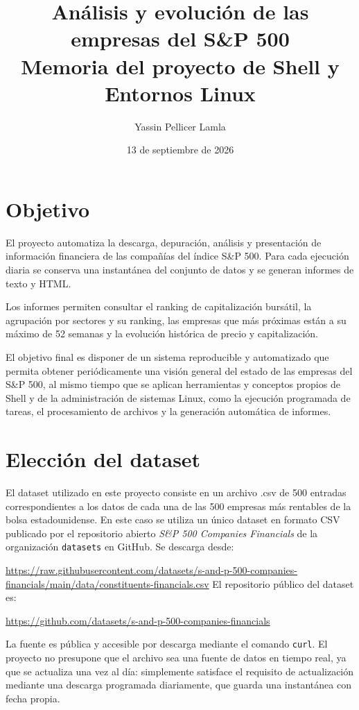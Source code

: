 \documentclass[11pt,a4paper]{article}
\title{\Huge Análisis y evolución de las empresas del S\&P 500\\[0.5\baselineskip] \large Memoria del proyecto de Shell y Entornos Linux}
\author{Yassin Pellicer Lamla}
\date{13 de septiembre de 2026}
\begin{document}
\maketitle
\tableofcontents
\newpage

\section{Objetivo}
El proyecto automatiza la descarga, depuración, análisis y presentación de información financiera de las compañías del índice S\&P 500. Para cada ejecución diaria se conserva una instantánea del conjunto de datos y se generan informes de texto y HTML. 

Los informes permiten consultar el ranking de capitalización bursátil, la agrupación por sectores y su ranking, las empresas que más próximas están a su máximo de 52 semanas y la evolución histórica de precio y capitalización.

El objetivo final es disponer de un sistema reproducible y automatizado que permita obtener periódicamente una visión general del estado de las empresas del S\&P 500, al mismo tiempo que se aplican herramientas y conceptos propios de Shell y de la administración de sistemas Linux, como la ejecución programada de tareas, el procesamiento de archivos y la generación automática de informes.

\section{Elección del dataset}
El dataset utilizado en este proyecto consiste en un archivo .csv de 500 entradas correspondientes a los datos de cada una de las 500 empresas más rentables de la bolsa estadounidense. En este caso se utiliza un único dataset en formato CSV publicado por el repositorio abierto \emph{S\&P 500 Companies Financials} de la organización \texttt{datasets} en GitHub. Se descarga desde:

\begin{flushleft}
\url{https://raw.githubusercontent.com/datasets/s-and-p-500-companies-financials/main/data/constituents-financials.csv}
\newline\newline
El repositorio público del dataset es:

\url{https://github.com/datasets/s-and-p-500-companies-financials}
\end{flushleft}

La fuente es pública y accesible por descarga mediante el comando \texttt{curl}. El proyecto no presupone que el archivo sea una fuente de datos en tiempo real, ya que se actualiza una vez al día: simplemente satisface el requisito de actualización mediante una descarga programada diariamente, que guarda una instantánea con fecha propia.
\end{document}

